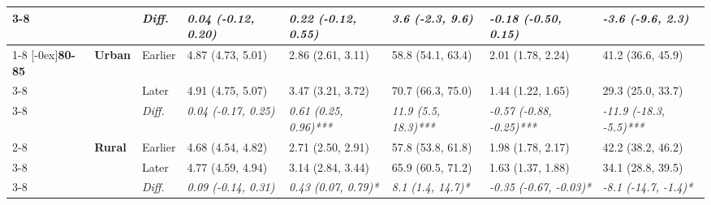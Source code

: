 \documentclass[12pt, a4paper]{article}
\begin{document}
\begin{appendices}
\begin{table}[!p]
{\begin{tabular}[t]{>{}l>{}lllllll}
        \cmidrule{3-8}
                                              &                                 & \cellcolor{gray!10}\em{Diff.} & \cellcolor{gray!10}\em{0.04 (-0.12, 0.20)}  & \cellcolor{gray!10}\em{0.22 (-0.12, 0.55)}   & \cellcolor{gray!10}\em{3.6 (-2.3, 9.6)}     & \cellcolor{gray!10}\em{-0.18 (-0.50, 0.15)}     & \cellcolor{gray!10}\em{-3.6 (-9.6, 2.3)}       \\
        \cmidrule{1-8}
        \multirow{9}{*}[-0ex]{\textbf{80-85}} & \multirow{3}{*}{\textbf{Urban}} & Earlier                       & 4.87 (4.73, 5.01)                           & 2.86 (2.61, 3.11)                            & 58.8 (54.1, 63.4)                           & 2.01 (1.78, 2.24)                               & 41.2 (36.6, 45.9)                              \\
        \cmidrule{3-8}
                                              &                                 & Later                         & 4.91 (4.75, 5.07)                           & 3.47 (3.21, 3.72)                            & 70.7 (66.3, 75.0)                           & 1.44 (1.22, 1.65)                               & 29.3 (25.0, 33.7)                              \\
        \cmidrule{3-8}
                                              &                                 & \cellcolor{gray!10}\em{Diff.} & \cellcolor{gray!10}\em{0.04 (-0.17, 0.25)}  & \cellcolor{gray!10}\em{0.61 (0.25, 0.96)***} & \cellcolor{gray!10}\em{11.9 (5.5, 18.3)***} & \cellcolor{gray!10}\em{-0.57 (-0.88, -0.25)***} & \cellcolor{gray!10}\em{-11.9 (-18.3, -5.5)***} \\
        \cmidrule{2-8}
                                              & \multirow{3}{*}{\textbf{Rural}} & Earlier                       & 4.68 (4.54, 4.82)                           & 2.71 (2.50, 2.91)                            & 57.8 (53.8, 61.8)                           & 1.98 (1.78, 2.17)                               & 42.2 (38.2, 46.2)                              \\
        \cmidrule{3-8}
                                              &                                 & Later                         & 4.77 (4.59, 4.94)                           & 3.14 (2.84, 3.44)                            & 65.9 (60.5, 71.2)                           & 1.63 (1.37, 1.88)                               & 34.1 (28.8, 39.5)                              \\
        \cmidrule{3-8}
                                              &                                 & \cellcolor{gray!10}\em{Diff.} & \cellcolor{gray!10}\em{0.09 (-0.14, 0.31)}  & \cellcolor{gray!10}\em{0.43 (0.07, 0.79)*}   & \cellcolor{gray!10}\em{8.1 (1.4, 14.7)*}    & \cellcolor{gray!10}\em{-0.35 (-0.67, -0.03)*}   & \cellcolor{gray!10}\em{-8.1 (-14.7, -1.4)*}    \\

\end{tabular}}
\end{table}
\end{appendices}
\end{document}
